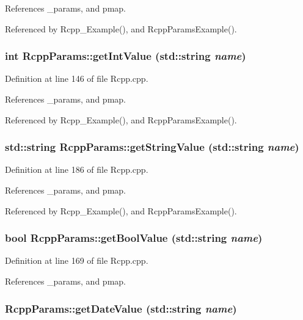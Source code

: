 References \_\-params, and pmap.

Referenced by Rcpp\_\-Example(), and RcppParamsExample().\hypertarget{classRcppParams_bb554151641ab12a793f28d3d081973a}{
\subsubsection[getIntValue]{\setlength{\rightskip}{0pt plus 5cm}int RcppParams::getIntValue (std::string {\em name})}}
\label{classRcppParams_bb554151641ab12a793f28d3d081973a}




Definition at line 146 of file Rcpp.cpp.

References \_\-params, and pmap.

Referenced by Rcpp\_\-Example(), and RcppParamsExample().\hypertarget{classRcppParams_dc04f4552582eeec09b0806ddd8e2581}{
\subsubsection[getStringValue]{\setlength{\rightskip}{0pt plus 5cm}std::string RcppParams::getStringValue (std::string {\em name})}}
\label{classRcppParams_dc04f4552582eeec09b0806ddd8e2581}




Definition at line 186 of file Rcpp.cpp.

References \_\-params, and pmap.

Referenced by Rcpp\_\-Example(), and RcppParamsExample().\hypertarget{classRcppParams_d818a50a0e269360f3f74c5259dec882}{
\subsubsection[getBoolValue]{\setlength{\rightskip}{0pt plus 5cm}bool RcppParams::getBoolValue (std::string {\em name})}}
\label{classRcppParams_d818a50a0e269360f3f74c5259dec882}




Definition at line 169 of file Rcpp.cpp.

References \_\-params, and pmap.\hypertarget{classRcppParams_ae20c7ee73aa2f1176837cc9387ad008}{
\subsubsection[getDateValue]{ RcppParams::getDateValue (std::string {\em name})}}
\label{classRcppParams_ae20c7ee73aa2f1176837cc9387ad008}





